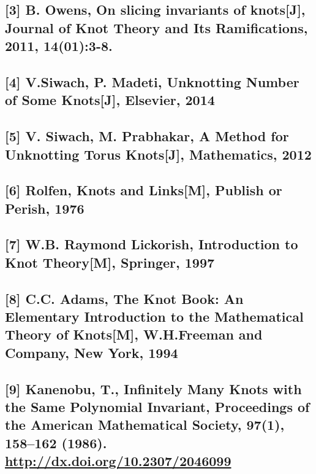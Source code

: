 \documentclass[lang=cn]{elegantpaper}
\begin{document}
\subsection{[3] B. Owens, On slicing invariants of knots[J], Journal of Knot Theory and Its Ramifications, 2011, 14(01):3-8.}
\label{sec:org9da4c73}
\subsection{[4] V.Siwach, P. Madeti, Unknotting Number of Some Knots[J], Elsevier, 2014}
\label{sec:org71630ce}
\subsection{[5] V. Siwach, M. Prabhakar, A Method for Unknotting Torus Knots[J], Mathematics, 2012}
\label{sec:orga6bf995}
\subsection{[6] Rolfen, Knots and Links[M], Publish or Perish, 1976}
\label{sec:orgbbdadd4}
\subsection{[7] W.B. Raymond Lickorish, Introduction to Knot Theory[M], Springer, 1997}
\label{sec:org8bf07f7}
\subsection{[8] C.C. Adams, The Knot Book: An Elementary Introduction to the Mathematical Theory of Knots[M], W.H.Freeman and Company, New York, 1994}
\label{sec:org2f41126}
\subsection{[9] Kanenobu, T., Infinitely Many Knots with the Same Polynomial Invariant, Proceedings of the American Mathematical Society, 97(1), 158–162 (1986).  \url{http://dx.doi.org/10.2307/2046099}}
\label{sec:org33355f0}

\cite{kanenobuInfinitelyManyKnots1986}



\end{document}
